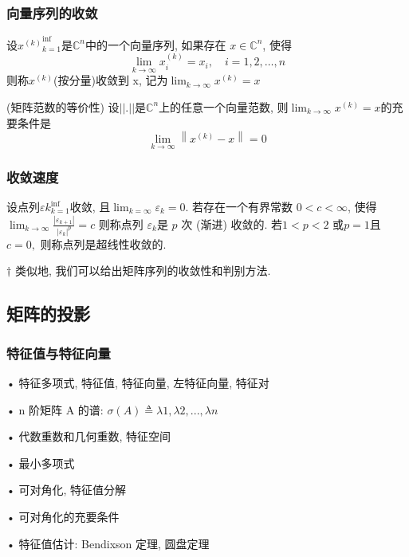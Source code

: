 \documentclass[12pt,a4paper]{article}
\begin{document}
\subsubsection{向量序列的收敛}
设${x^{(k)}}^{\inf}_{
k=1}$是$\mathbb{C}^n $中的一个向量序列, 如果存在 $x ∈ \mathbb{C}^n$, 使得
$$
\lim _{k \rightarrow \infty} x_{i}^{(k)}=x_{i}, \quad i=1,2, \ldots, n
$$
则称${x^{(k)}}$(按分量)收敛到 x, 记为$\lim _{k \rightarrow \infty} x^{(k)}=x$

\begin{framed}
	\begin{theorem}(矩阵范数的等价性)
		设$||.||$是$\mathbb{C}^{n}$上的任意一个向量范数, 则$\lim _{k \rightarrow \infty} x^{(k)}=x$的充要条件是
		$$
		\lim _{k \rightarrow \infty}\left\|x^{(k)}-x\right\|=0
		$$
	\end{theorem}
\end{framed}

\subsubsection{收敛速度}
设点列${εk}_{k=1}^{\inf}$收敛, 且$\lim _{k=\infty} \varepsilon_{k}=0$. 若存在一个有界常数 $0 < c < ∞$, 使得
$\lim _{k \rightarrow \infty} \frac{\left|\varepsilon_{k+1}\right|}{\left|\varepsilon_{k}\right|^{p}}=c$
则称点列 ${ε_k} $是 $p$ 次 (渐进) 收敛的. 若$ 1 < p < 2$ 或$ p = 1 $且 $c = 0,$ 则称点列是超线性收敛的.

\begin{framed}
    	$†$ 类似地, 我们可以给出矩阵序列的收敛性和判别方法.
\end{framed}

\subsection{矩阵的投影}
\subsubsection{特征值与特征向量}

• 特征多项式, 特征值, 特征向量, 左特征向量, 特征对

• n 阶矩阵 A 的谱: $σ(A) ≜ {λ1, λ2, . . . , λn}$

• 代数重数和几何重数, 特征空间

• 最小多项式

• 可对角化, 特征值分解

• 可对角化的充要条件

• 特征值估计: Bendixson 定理, 圆盘定理
\end{document}
